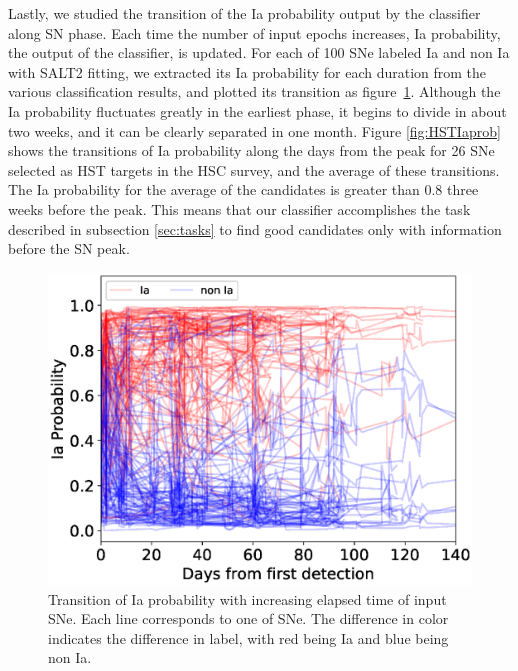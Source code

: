 \documentclass[useamsfonts]{pasj01}
\begin{document}
Lastly, we studied the transition of the Ia probability output by the classifier along SN phase.
Each time the number of input epochs increases, Ia probability, the output of the classifier, is updated.
For each of 100 SNe labeled Ia and non Ia with SALT2 fitting, we extracted its Ia probability for each duration from the various classification results, and plotted its transition as figure\ \ref{fig:visualized_Ia_prob}.
Although the Ia probability fluctuates greatly in the earliest phase, it begins to divide in about two weeks, and it can be clearly separated in one month.
Figure \ref{fig:HSTIaprob} shows the transitions of Ia probability along the days from the peak for 26 SNe selected as HST targets in the HSC survey, and the average of these transitions.
The Ia probability for the average of the candidates is greater than 0.8 three weeks before the peak.
This means that our classifier accomplishes the task described in subsection \ref{sec:tasks} to find good candidates only with information before the SN peak.
%
\begin{figure}[htbp]
  \begin{center}
     \includegraphics[width=\columnwidth]{figures/n_observations_visualized_Ia_probability_200319.eps}
  \end{center}
  \caption{%
  Transition of Ia probability with increasing elapsed time of input SNe.
  Each line corresponds to one of SNe.
  The difference in color indicates the difference in label, with red being Ia and blue being non Ia.
  }%
  \label{fig:visualized_Ia_prob}
\end{figure}
\end{document}
